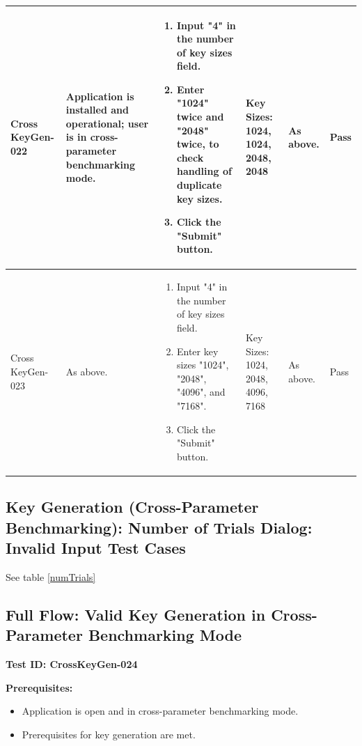 \documentclass[]{final_report}
\theoremstyle{definition}
\begin{document}
\begin{longtable}{|p{1.5cm}|p{2.5cm}|p{3.5cm}|p{2.5cm}|p{3cm}|p{2cm}|}
  \hline
  Cross
  KeyGen-022 & Application is installed and operational; user is in cross-parameter benchmarking mode. & 
  \begin{enumerate}
  \item Input "4" in the number of key sizes field.
  \item Enter "1024" twice and "2048" twice, to check handling of duplicate key sizes.
  \item Click the "Submit" button.
  \end{enumerate} & Key Sizes: 1024, 1024, 2048, 2048 & As above. & Pass \\
  \hline
  Cross
  KeyGen-023 & As above. & 
  \begin{enumerate}
  \item Input "4" in the number of key sizes field.
  \item Enter key sizes "1024", "2048", "4096", and "7168".
  \item Click the "Submit" button.
  \end{enumerate} & Key Sizes: 1024, 2048, 4096, 7168 & As above. & Pass \\
   \hline
 \end{longtable}


\subsection*{Key Generation (Cross-Parameter Benchmarking): Number of Trials Dialog: Invalid Input Test Cases}
See table \ref{numTrials}


\subsection*{Full Flow: Valid Key Generation in Cross-Parameter Benchmarking Mode}

\textbf{Test ID: CrossKeyGen-024}

\textbf{Prerequisites:}
\begin{itemize}
    \item Application is open and in cross-parameter benchmarking mode.
    \item Prerequisites for key generation are met.
\end{itemize}
\end{document}
